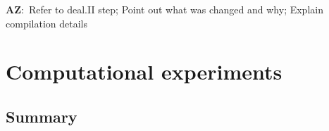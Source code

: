 \documentclass[12pt]{article}
\newcommand{\AZ}[1]{{\color{red}\textbf{AZ}:~#1}}
\begin{document}
\AZ{Refer to deal.II step; Point out what was changed and why; Explain compilation details}

\section{Computational experiments}

\subsection{Summary}

%
%
\end{document}
